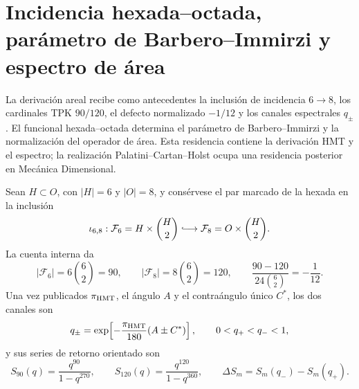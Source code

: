 \section{Incidencia hexada--octada, parámetro de Barbero--Immirzi y espectro de área}
\label{sec:l9s102:barbero-area}

La derivación areal recibe como antecedentes la inclusión de incidencia
\(6\to8\), los cardinales TPK \(90/120\), el defecto normalizado
\(-1/12\) y los canales espectrales \(q_\pm\). El funcional
hexada--octada determina el parámetro de Barbero--Immirzi y la
normalización del operador de área. Esta residencia contiene la derivación
HMT y el espectro; la realización Palatini--Cartan--Holst ocupa una residencia
posterior en Mecánica Dimensional.

Sean \(H\subset O\), con \(|H|=6\) y \(|O|=8\), y consérvese el par
marcado de la hexada en la inclusión
\begin{equation}
 \iota_{6,8}:\mathcal F_6=H\times\binom H2
 \lhook\joinrel\longrightarrow
 \mathcal F_8=O\times\binom H2.
 \label{eq:l9s102:barbero-inclusion-incidencia}
\end{equation}
La cuenta interna da
\begin{equation}
 |\mathcal F_6|=6\binom62=90,
 \qquad |\mathcal F_8|=8\binom62=120,
 \qquad
 \frac{90-120}{24\binom62}=-\frac1{12}.
 \label{eq:l9s102:barbero-conteos}
\end{equation}
Una vez publicados \(\pi_{\rm HMT}\), el ángulo \(A\) y el
contraángulo único \(C^*\), los dos canales son
\begin{equation}
 q_\pm=\exp\!\left[-\frac{\pi_{\rm HMT}}{180}(A\pm C^*)\right],
 \qquad 0<q_+<q_-<1,
 \label{eq:l9s102:barbero-qpm}
\end{equation}
y sus series de retorno orientado son
\begin{equation}
 S_{90}(q)=\frac{q^{90}}{1-q^{270}},\qquad
 S_{120}(q)=\frac{q^{120}}{1-q^{360}},\qquad
 \Delta S_m=S_m(q_-)-S_m(q_+).
 \label{eq:l9s102:barbero-series}
\end{equation}

